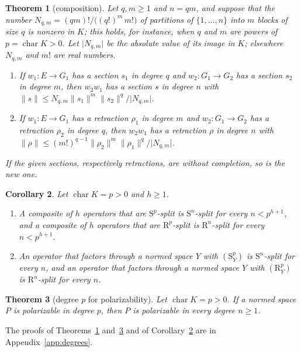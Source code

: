 \documentclass[11pt]{amsart}
\newtheorem{theorem}{Theorem}[section]
\newtheorem{corollary}[theorem]{Corollary}
\theoremstyle{definition}
\theoremstyle{remark}
\numberwithin{equation}{section}
\newcommand{\abs}[1]{\lvert #1\rvert}
\newcommand{\norm}[1]{\lVert #1\rVert}
\theoremstyle{plain}
\theoremstyle{definition}
\theoremstyle{plain}
\begin{document}
\begin{theorem}[composition]\label{cmb:thm:composition}
Let $q,m\ge1$ and $n=qm$, and suppose that the number $N_{q,m}=(qm)!/\bigl((q!)^m\,m!\bigr)$ of partitions of
$\{1,\dots,n\}$ into $m$ blocks of size $q$ is nonzero in $K$; this holds, for instance, when $q$ and $m$ are powers of
$p=\operatorname{char}K>0$. Let $\abs{N_{q,m}}$ be the absolute value of its image in $K$; elsewhere $N_{q,m}$ and $m!$
are real numbers.
\begin{enumerate}
\item If $w_1\colon E\to G_1$ has a section $s_1$ in degree $q$ and $w_2\colon G_1\to G_2$ has a section $s_2$ in degree
$m$, then $w_2w_1$ has a section $s$ in degree $n$ with $\norm s\le N_{q,m}\norm{s_1}^m\norm{s_2}^q/\abs{N_{q,m}}$.
\item If $w_1\colon E\to G_1$ has a retraction $\rho_1$ in degree $m$ and $w_2\colon G_1\to G_2$ has a retraction
$\rho_2$ in degree $q$, then $w_2w_1$ has a retraction $\rho$ in degree $n$ with
$\norm\rho\le(m!)^{q-1}\norm{\rho_2}^m\norm{\rho_1}^q/\abs{N_{q,m}}$.
\end{enumerate}
If the given sections, respectively retractions, are without completion, so is the new one.
\end{theorem}

\begin{corollary}\label{cmb:cor:composition}
Let $\operatorname{char}K=p>0$ and $h\ge1$.
\begin{enumerate}
\item A composite of $h$ operators that are $\mathrm S^p$-split is $\mathrm S^n$-split for every $n<p^{h+1}$, and a
composite of $h$ operators that are $\mathrm R^p$-split is $\mathrm R^n$-split for every $n<p^{h+1}$.
\item An operator that factors through a normed space $Y$ with $(\mathrm S^p_Y)$ is $\mathrm S^n$-split for every $n$,
and an operator that factors through a normed space $Y$ with $(\mathrm R^p_Y)$ is $\mathrm R^n$-split for every $n$.
\end{enumerate}
\end{corollary}

\begin{theorem}[degree $p$ for polarizability]\label{cmb:thm:polarizable-height}
Let $\operatorname{char}K=p>0$. If a normed space $P$ is polarizable in degree $p$, then $P$ is polarizable in every degree
$n\ge1$.
\end{theorem}

The proofs of Theorems~\ref{cmb:thm:composition} and~\ref{cmb:thm:polarizable-height} and of
Corollary~\ref{cmb:cor:composition} are in Appendix~\ref{app:degrees}.
\end{document}
